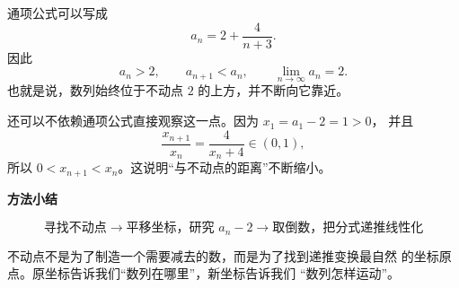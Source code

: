 \documentclass[zihao=-4]{exam-zh}
\begin{document}
\begin{question}[points=12]
\begin{solution}
通项公式可以写成
\[
 a_n=2+\frac4{n+3}.
\]
因此
\[
 a_n>2,\qquad
 a_{n+1}<a_n,\qquad
 \lim_{n\to\infty}a_n=2.
\]
也就是说，数列始终位于不动点 $2$ 的上方，并不断向它靠近。

还可以不依赖通项公式直接观察这一点。因为 $x_1=a_1-2=1>0$，
并且
\[
 \frac{x_{n+1}}{x_n}=\frac4{x_n+4}\in(0,1),
\]
所以 $0<x_{n+1}<x_n$。这说明“与不动点的距离”不断缩小。

\medskip
\textbf{方法小结}

\[
\boxed{
\text{寻找不动点}
\longrightarrow
\text{平移坐标，研究 }a_n-2
\longrightarrow
\text{取倒数，把分式递推线性化}
}
\]

不动点不是为了制造一个需要减去的数，而是为了找到递推变换最自然
的坐标原点。原坐标告诉我们“数列在哪里”，新坐标告诉我们
“数列怎样运动”。
\end{solution}
\end{question}
\end{document}
